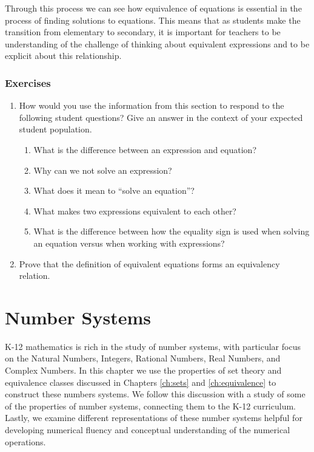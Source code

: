 \documentclass[
]{book}
\providecommand{\tightlist}{%
  \setlength{\itemsep}{0pt}\setlength{\parskip}{0pt}}
\theoremstyle{definition}
\theoremstyle{definition}
\theoremstyle{definition}
\theoremstyle{definition}
\theoremstyle{remark}
\begin{document}
Through this process we can see how equivalence of equations is essential in the process of finding solutions to equations. This means that as students make the transition from elementary to secondary, it is important for teachers to be understanding of the challenge of thinking about equivalent expressions and to be explicit about this relationship.

\hypertarget{exercises-9}{%
\subsection{Exercises}\label{exercises-9}}

\begin{enumerate}
\def\labelenumi{\arabic{enumi}.}
\tightlist
\item
  How would you use the information from this section to respond to the following student questions? Give an answer in the context of your expected student population.

  \begin{enumerate}
  \def\labelenumii{\alph{enumii}.}
  \tightlist
  \item
    What is the difference between an expression and equation?
  \item
    Why can we not solve an expression?
  \item
    What does it mean to ``solve an equation''?
  \item
    What makes two expressions equivalent to each other?
  \item
    What is the difference between how the equality sign is used when solving an equation versus when working with expressions?
  \end{enumerate}
\item
  Prove that the definition of equivalent equations forms an equivalency relation.
\end{enumerate}

\hypertarget{ch:number}{%
\chapter{Number Systems}\label{ch:number}}

K-12 mathematics is rich in the study of number systems, with particular focus on the Natural Numbers, Integers, Rational Numbers, Real Numbers, and Complex Numbers. In this chapter we use the properties of set theory and equivalence classes discussed in Chapters \ref{ch:sets} and \ref{ch:equivalence} to construct these numbers systems. We follow this discussion with a study of some of the properties of number systems, connecting them to the K-12 curriculum. Lastly, we examine different representations of these number systems helpful for developing numerical fluency and conceptual understanding of the numerical operations.
\end{document}
